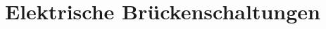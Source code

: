 

\subject{Versuch 302}
\title{Elektrische Brückenschaltungen}


    \maketitle
    \thispagestyle{empty}
    \tableofcontents
    \newpage
    
    
    
    \newpage
    
    
    \newpage
    \printbibliography{}
    

